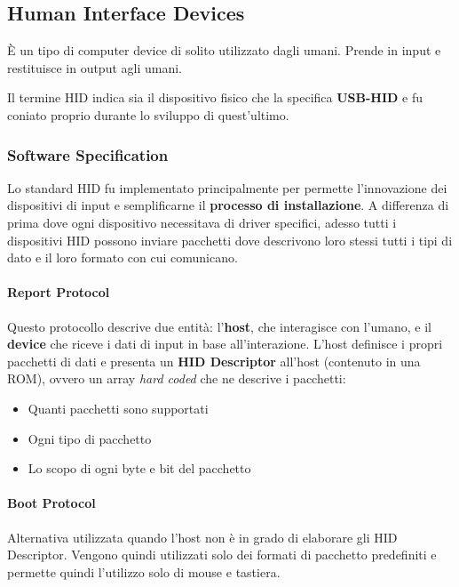 \subsection{Human Interface Devices}
\begin{definition}[HID]
	È un tipo di computer device di solito utilizzato dagli umani. Prende in input e restituisce in output agli umani.
\end{definition}
Il termine HID indica sia il dispositivo fisico che la specifica \textbf{USB-HID} e fu coniato proprio durante lo sviluppo di quest'ultimo.

\subsubsection{Software Specification}
Lo standard HID fu implementato principalmente per permette l'innovazione dei dispositivi di input e semplificarne il \textbf{processo di installazione}. A differenza di prima dove ogni dispositivo necessitava di driver specifici, adesso tutti i dispositivi HID possono inviare pacchetti dove descrivono loro stessi tutti i tipi di dato e il loro formato con cui comunicano.\\

\paragraph{Report Protocol} Questo protocollo descrive due entità: l'\textbf{host}, che interagisce con l'umano, e il \textbf{device} che riceve i dati di input in base all'interazione. L'host definisce  i propri pacchetti di dati e presenta un \textbf{HID Descriptor} all'host (contenuto in una ROM), ovvero un array \textit{hard coded} che ne descrive i pacchetti:
\begin{itemize}
	\item Quanti pacchetti sono supportati
	\item Ogni tipo di pacchetto
	\item Lo scopo di ogni byte e bit del pacchetto
\end{itemize}

\paragraph{Boot Protocol} Alternativa utilizzata quando l'host non è in grado di elaborare gli HID Descriptor. Vengono quindi utilizzati solo dei formati di pacchetto predefiniti e permette quindi l'utilizzo solo di mouse e tastiera.\\

